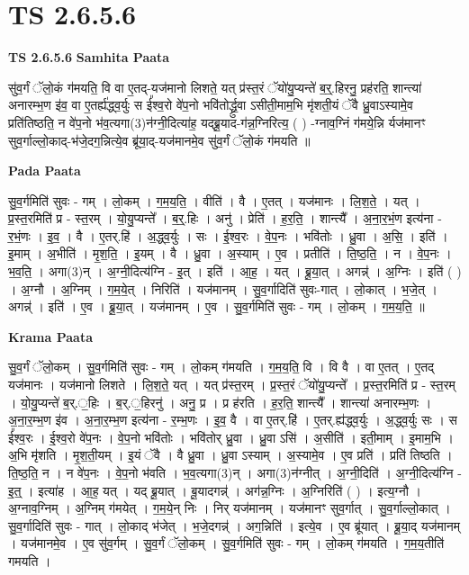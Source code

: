 \documentclass[17pt]{extarticle}
\begin{document}
\section*{ TS 2.6.5.6 }

\textbf{TS 2.6.5.6 } \newline
\textbf{Samhita Paata} \newline

सु॑व॒र्गं ॅलो॒कं ग॑मयति॒ वि वा ए॒तद्-यज॑मानो लिशते॒ यत् प्र॑स्त॒रं ॅयो॑यु॒प्यन्ते॑ ब॒र्॒.हिरनु॒ प्रह॑रति॒ शान्त्या॑ अनारम्भ॒ण इ॑व॒ वा ए॒तर्ह्य॑द्ध्व॒र्युः स ई᳚श्व॒रो वे॑प॒नो भवि॑तोर्द्ध्रु॒वा ऽसीती॒माम॒भि मृ॑शती॒यं ॅवै ध्रु॒वाऽस्यामे॒व प्रति॑तिष्ठति॒ न वे॑प॒नो भ॑व॒त्यगा(3)न॑ग्नी॒दित्या॑ह॒ यद्ब्रू॒याद-ग॑न्न॒ग्निरित्य॒ ( ) -ग्नाव॒ग्निं ग॑मये॒न्नि र्यज॑मानꣳ सुव॒र्गाल्लो॒काद्-भ॑जे॒दग॒न्नित्ये॒व ब्रू॑या॒द्-यज॑मानमे॒व सु॑व॒र्गं ॅलो॒कं ग॑मयति ॥ \newline

\textbf{Pada Paata} \newline

सु॒व॒र्गमिति॑ सुवः - गम् । लो॒कम् । ग॒म॒य॒ति॒ । वीति॑ । वै । ए॒तत् । यज॑मानः । लि॒श॒ते॒ । यत् । प्र॒स्त॒रमिति॑ प्र - स्त॒रम् । यो॒यु॒प्यन्ते᳚ । ब॒र्॒.हिः । अनु॑ । प्रेति॑ । ह॒र॒ति॒ । शान्त्यै᳚ । अ॒ना॒र॒भं॒ण इत्य॑ना - र॒भं॒णः । इ॒व॒ । वै । ए॒तर्.हि॑ । अ॒द्ध्व॒र्युः । सः । ई॒श्व॒रः । वे॒प॒नः । भवि॑तोः । ध्रु॒वा । अ॒सि॒ । इति॑ । इ॒माम् । अ॒भीति॑ । मृ॒श॒ति॒ । इ॒यम् । वै । ध्रु॒वा । अ॒स्याम् । ए॒व । प्रतीति॑ । ति॒ष्ठ॒ति॒ । न । वे॒प॒नः । भ॒व॒ति॒ । अगा(3)न् । अ॒ग्नी॒दित्य॑ग्नि - इ॒त् । इति॑ । आ॒ह॒ । यत् । ब्रू॒या॒त् । अगन्न्॑ । अ॒ग्निः । इति॑ ( ) । अ॒ग्नौ । अ॒ग्निम् । ग॒म॒ये॒त् । निरिति॑ । यज॑मानम् । सु॒व॒र्गादिति॑ सुवः-गात् । लो॒कात् । भ॒जे॒त् । अगन्न्॑ । इति॑ । ए॒व । ब्रू॒या॒त् । यज॑मानम् । ए॒व । सु॒व॒र्गमिति॑ सुवः - गम् । लो॒कम् । ग॒म॒य॒ति॒ ॥  \newline


\textbf{Krama Paata} \newline

सु॒व॒र्गं ॅलो॒कम् । सु॒व॒र्गमिति॑ सुवः - गम् । लो॒कम् ग॑मयति । ग॒म॒य॒ति॒ वि । वि वै । वा ए॒तत् । ए॒तद् यज॑मानः । यज॑मानो लिशते । लि॒श॒ते॒ यत् । यत् प्र॑स्त॒रम् । प्र॒स्त॒रं ॅयो॑यु॒प्यन्ते᳚ । प्र॒स्त॒रमिति॑ प्र - स्त॒रम् । यो॒यु॒प्यन्ते॑ ब॒र्.॒हिः । ब॒र्.॒हिरनु॑ । अनु॒ प्र । प्र ह॑रति । ह॒र॒ति॒ शान्त्यै᳚ । शान्त्या॑ अनारम्भ॒णः । अ॒ना॒र॒म्भ॒ण इ॑व । अ॒ना॒र॒म्भ॒ण इत्य॑ना - र॒म्भ॒णः । इ॒व॒ वै । वा ए॒तर्.हि॑ । ए॒तर्.ह्य॑द्ध्व॒र्युः । अ॒द्ध्व॒र्युः सः । स ई᳚श्व॒रः । ई॒श्व॒रो वे॑प॒नः । वे॒प॒नो भवि॑तोः । भवि॑तोर् ध्रु॒वा । ध्रु॒वा ऽसि॑ । अ॒सीति॑ । इती॒माम् । इ॒माम॒भि । अ॒भि मृ॑शति । मृ॒श॒ती॒यम् । इ॒यं ॅवै । वै ध्रु॒वा । ध्रु॒वा ऽस्याम् । अ॒स्यामे॒व । ए॒व प्रति॑ । प्रति॑ तिष्ठति । ति॒ष्ठ॒ति॒ न । न वे॑प॒नः । वे॒प॒नो भ॑वति । भ॒व॒त्यगा(3)न् । अगा(3)न॑ग्नीत् । अ॒ग्नी॒दिति॑ । अ॒ग्नी॒दित्य॑ग्नि - इ॒त्॒ । इत्या॑ह । आ॒ह॒ यत् । यद् ब्रू॒यात् । बू॒यादगन्न्॑ । अग॑न्न॒ग्निः । अ॒ग्निरिति॑ ( ) । इत्य॒ग्नौ । अ॒ग्नाव॒ग्निम् । अ॒ग्निम् ग॑मयेत् । ग॒म॒ये॒न् निः । निर् यज॑मानम् । यज॑मानꣳ सुव॒र्गात् । सु॒व॒र्गाल्लो॒कात् । सु॒व॒र्गादिति॑ सुवः - गात् । लो॒काद् भ॑जेत् । भ॒जे॒दगन्न्॑ । अग॒न्निति॑ । इत्ये॒व । ए॒व ब्रू॑यात् । ब्रू॒या॒द् यज॑मानम् । यज॑मानमे॒व । ए॒व सु॑व॒र्गम् । सु॒व॒र्गं ॅलो॒कम् । सु॒व॒र्गमिति॑ सुवः - गम् । लो॒कम् ग॑मयति । ग॒म॒य॒तीति॑ गमयति । \newline
\end{document}
